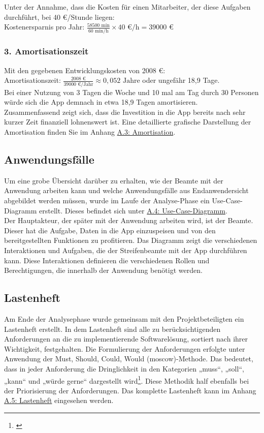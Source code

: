 \documentclass[a4paper,12pt]{article}
\begin{document}
Unter der Annahme, dass die Kosten für einen Mitarbeiter, der diese Aufgaben durchführt, bei 40 €/Stunde liegen:\\
Kostenersparnis pro Jahr: $\frac{58500 \text{ min}}{60 \text{ min/h}} \times 40 \text{ €/h} = 39000 \text{ €}$

\subsubsection*{3. Amortisationszeit}
Mit den gegebenen Entwicklungskosten von 2008 €:\\
Amortisationszeit: $\frac{2008 \text{ €}}{39000 \text{ €/Jahr}} \approx 0,052 \text{ Jahre}$ oder ungefähr 18,9 Tage.\\
Bei einer Nutzung von 3 Tagen die Woche und 10 mal am Tag durch 30 Personen würde sich die App demnach in etwa 18,9 Tagen amortisieren.\\
Zusammenfassend zeigt sich, dass die Investition in die App bereits nach sehr kurzer Zeit finanziell lohnenswert ist. Eine detaillierte grafische Darstellung der Amortisation finden Sie im Anhang \hyperref[sec:amortisation]{A.3: Amortisation}.

\subsection{Anwendungsfälle}
\label{sec:anwendungsfälle}
Um eine grobe Übersicht darüber zu erhalten, wie der Beamte mit der Anwendung arbeiten kann und welche Anwendungsfälle aus Endanwendersicht abgebildet werden müssen, wurde im Laufe der Analyse-Phase ein Use-Case-Diagramm erstellt. Dieses befindet sich unter \hyperref[sec:use-case-diagramm]{A.4: Use-Case-Diagramm}.
\\
Der Hauptakteur, der später mit der Anwendung arbeiten wird, ist der Beamte. Dieser hat die Aufgabe, Daten in die App einzuspeisen und von den bereitgestellten Funktionen zu profitieren. Das Diagramm zeigt die verschiedenen Interaktionen und Aufgaben, die der Streifenbeamte mit der App durchführen kann. Diese Interaktionen definieren die verschiedenen Rollen und Berechtigungen, die innerhalb der Anwendung benötigt werden.

\subsection{Lastenheft}
Am Ende der Analysephase wurde gemeinsam mit den Projektbeteiligten ein Lastenheft erstellt. In dem Lastenheft sind alle zu berücksichtigenden Anforderungen an die zu implementierende Softwarelösung, sortiert nach ihrer Wichtigkeit, festgehalten. Die Formulierung der Anforderungen erfolgte unter Anwendung der Must, Should, Could, Would (\acrshort{moscow})-Methode. Das bedeutet, dass in jeder Anforderung die Dringlichkeit in den Kategorien „muss“, „soll“, „kann“ und „würde gerne“ dargestellt wird\footnote{\citeauthor{cockburn2001agile}}. Diese Methodik half ebenfalls bei der Priorisierung der Anforderungen. Das komplette Lastenheft kann im Anhang \hyperref[sec:lastenheft]{A.5: Lastenheft} eingesehen werden.
\end{document}
